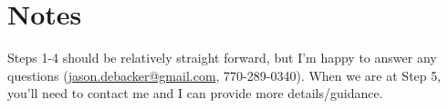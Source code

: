 \documentclass[article,11pt,letterpaper,fleqn]{article}
\theoremstyle{definition}
\numberwithin{equation}{section}
\begin{document}
\section*{Notes}
\label{sec:notes}

Steps 1-4 should be relatively straight forward, but I'm happy to answer any questions (\href{mailto:jason.debacker@gmail.com}{jason.debacker@gmail.com}, 770-289-0340).  When we are at Step 5, you'll need to contact me and I can provide more details/guidance.


\end{document}
